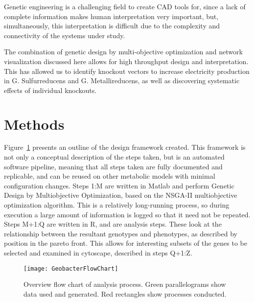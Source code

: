 \documentclass[a4paper,twocolumn]{article}
\begin{document}
Genetic engineering is a challenging field to create CAD tools for, since a lack of complete information makes human interpretation very important, but, simultaneously, this interpretation is difficult due to the complexity and connectivity of the systems under study. 


The combination of genetic design by multi-objective optimization and network visualization discussed here allows for high throughput design and interpretation. This has allowed us to identify knockout vectors to increase electricity production in G. Sulfurreducens and G. Metallireducens, as well as discovering systematic effects of individual knockouts.

\section{Methods}

Figure~\ref{fig:flowdiagram} presents an outline of the design framework created. This framework is not only a conceptual description of the steps taken, but is an automated software pipeline, meaning that all steps taken are fully documented and replicable, and can be reused on other metabolic models with minimal configuration changes. Steps 1:M are written in Matlab and perform Genetic Design by Multiobjective Optimization, based on the NSGA-II multiobjective optimization algorithm. This is a relatively long-running process, so during execution a large amount of information is logged so that it need not be repeated.  Steps M+1:Q are written in R, and are analysis steps. These look at the relationship between the resultant genotypes and phenotypes, as described by position in the pareto front. This allows for interesting subsets of the genes to be selected and examined in cytoscape, described in steps Q+1:Z.

\begin{figure}
\label{fig:flowdiagram}
\texttt{[image: GeobacterFlowChart]}
\caption{Overview flow chart of analysis process. Green parallelograms show data used and generated. Red rectangles show processes conducted.}
\end{figure}
\end{document}
